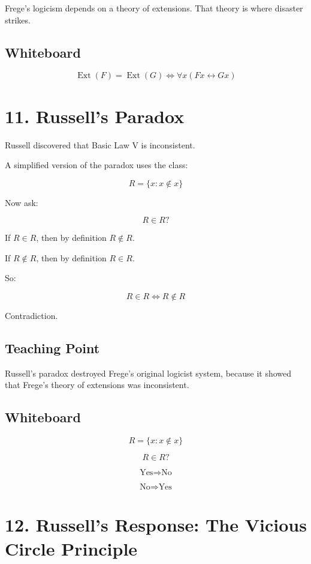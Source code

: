 \documentclass[11pt]{article}
\begin{document}
Frege's logicism depends on a theory of extensions. That theory is where disaster strikes.

\subsection*{Whiteboard}

\[
\operatorname{Ext}(F)=\operatorname{Ext}(G)
\Longleftrightarrow
\forall x(Fx \leftrightarrow Gx)
\]

\section*{11. Russell's Paradox}

Russell discovered that Basic Law V is inconsistent.

A simplified version of the paradox uses the class:

\[
R = \{x : x \notin x\}
\]

Now ask:

\[
R \in R?
\]

If \(R \in R\), then by definition \(R \notin R\).

If \(R \notin R\), then by definition \(R \in R\).

So:

\[
R \in R
\Longleftrightarrow
R \notin R
\]

Contradiction.

\subsection*{Teaching Point}

Russell's paradox destroyed Frege's original logicist system, because it showed that
Frege's theory of extensions was inconsistent.

\subsection*{Whiteboard}

\[
R = \{x : x \notin x\}
\]

\[
R \in R?
\]

\[
\text{Yes} \Rightarrow \text{No}
\]

\[
\text{No} \Rightarrow \text{Yes}
\]

\section*{12. Russell's Response: The Vicious Circle Principle}
\end{document}
